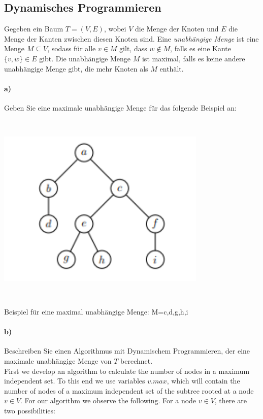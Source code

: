 \documentclass[paper=a4, fontsize=11pt]{scrartcl}
\numberwithin{equation}{section}
\numberwithin{figure}{section}
\numberwithin{table}{section}
\begin{document}
\subsection{Dynamisches Programmieren}
Gegeben ein Baum $T=(V,E)$, wobei $V$ die Menge der Knoten und $E$ die Menge der Kanten zwischen diesen
Knoten sind. Eine \emph{unabhängige Menge} ist eine Menge $M \subseteq V$, sodass
für alle $v \in M$ gilt, dass $w \notin M$, falls es eine Kante $\{v,w\} \in E$ gibt.
Die unabhängige Menge $M$ ist maximal, falls es keine andere unabhängige Menge gibt, die mehr
Knoten als $M$ enthält.

\paragraph{a)}
 Geben Sie eine maximale unabhängige Menge für das folgende Beispiel an: \\
 
 \includegraphics[width=10cm,height=10cm]{treeA.png} \\
 
 Beispiel für eine maximal unabhängige Menge: M={c,d,g,h,i}

\paragraph{b)} 
Beschreiben Sie einen Algorithmus mit Dynamischem Programmieren, der eine maximale unabhängige Menge von $T$ berechnet. \\

First we develop an algorithm to calculate the number of nodes in a maximum independent set. To this end we use variables $v.max$, which will contain the number of nodes of a maximum independent set of the subtree rooted at a node $v \in V$. For our algorithm we observe the following. For a node $v \in V$, there are two possibilities: \\
\end{document}
